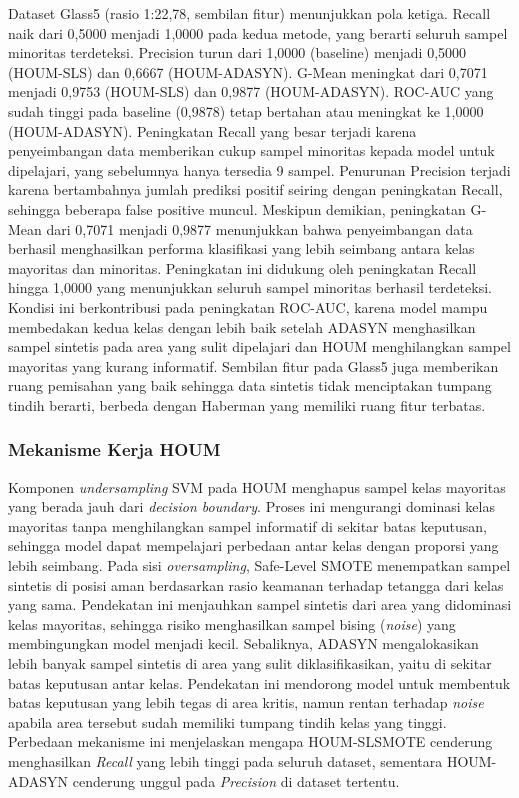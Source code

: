 Dataset Glass5 (rasio 1:22,78, sembilan fitur) menunjukkan pola ketiga. Recall naik dari 0,5000 menjadi 1,0000 pada kedua metode, yang berarti seluruh sampel minoritas terdeteksi. Precision turun dari 1,0000 (baseline) menjadi 0,5000 (HOUM-SLS) dan 0,6667 (HOUM-ADASYN). G-Mean meningkat dari 0,7071 menjadi 0,9753 (HOUM-SLS) dan 0,9877 (HOUM-ADASYN). ROC-AUC yang sudah tinggi pada baseline (0,9878) tetap bertahan atau meningkat ke 1,0000 (HOUM-ADASYN). Peningkatan Recall yang besar terjadi karena penyeimbangan data memberikan cukup sampel minoritas kepada model untuk dipelajari, yang sebelumnya hanya tersedia 9 sampel. Penurunan Precision terjadi karena bertambahnya jumlah prediksi positif seiring dengan peningkatan Recall, sehingga beberapa false positive muncul. Meskipun demikian, peningkatan G-Mean dari 0,7071 menjadi 0,9877 menunjukkan bahwa penyeimbangan data berhasil menghasilkan performa klasifikasi yang lebih seimbang antara kelas mayoritas dan minoritas. Peningkatan ini didukung oleh peningkatan Recall hingga 1,0000 yang menunjukkan seluruh sampel minoritas berhasil terdeteksi. Kondisi ini berkontribusi pada peningkatan ROC-AUC, karena model mampu membedakan kedua kelas dengan lebih baik setelah ADASYN menghasilkan sampel sintetis pada area yang sulit dipelajari dan HOUM menghilangkan sampel mayoritas yang kurang informatif. Sembilan fitur pada Glass5 juga memberikan ruang pemisahan yang baik sehingga data sintetis tidak menciptakan tumpang tindih berarti, berbeda dengan Haberman yang memiliki ruang fitur terbatas. \par


\subsubsection{Mekanisme Kerja HOUM}
Komponen \textit{undersampling} SVM pada HOUM menghapus sampel kelas mayoritas yang berada jauh dari \textit{decision boundary}. Proses ini mengurangi dominasi kelas mayoritas tanpa menghilangkan sampel informatif di sekitar batas keputusan, sehingga model dapat mempelajari perbedaan antar kelas dengan proporsi yang lebih seimbang. Pada sisi \textit{oversampling}, Safe-Level SMOTE menempatkan sampel sintetis di posisi aman berdasarkan rasio keamanan terhadap tetangga dari kelas yang sama. Pendekatan ini menjauhkan sampel sintetis dari area yang didominasi kelas mayoritas, sehingga risiko menghasilkan sampel bising (\textit{noise}) yang membingungkan model menjadi kecil. Sebaliknya, ADASYN mengalokasikan lebih banyak sampel sintetis di area yang sulit diklasifikasikan, yaitu di sekitar batas keputusan antar kelas. Pendekatan ini mendorong model untuk membentuk batas keputusan yang lebih tegas di area kritis, namun rentan terhadap \textit{noise} apabila area tersebut sudah memiliki tumpang tindih kelas yang tinggi. Perbedaan mekanisme ini menjelaskan mengapa HOUM-SLSMOTE cenderung menghasilkan \textit{Recall} yang lebih tinggi pada seluruh dataset, sementara HOUM-ADASYN cenderung unggul pada \textit{Precision} di dataset tertentu. \par
